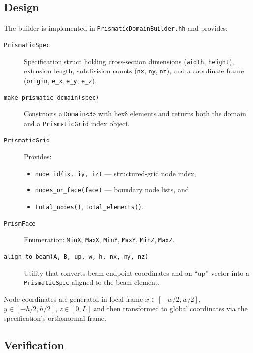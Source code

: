 \subsection{Design}

The builder is implemented in \texttt{PrismaticDomainBuilder.hh} and
provides:

\begin{description}
  \item[\texttt{PrismaticSpec}] Specification struct holding cross-section
    dimensions (\texttt{width}, \texttt{height}), extrusion length,
    subdivision counts (\texttt{nx}, \texttt{ny}, \texttt{nz}), and a
    coordinate frame (\texttt{origin}, \texttt{e\_x}, \texttt{e\_y},
    \texttt{e\_z}).

  \item[\texttt{make\_prismatic\_domain(spec)}] Constructs a
    \texttt{Domain<3>} with hex8 elements and returns both the domain
    and a \texttt{PrismaticGrid} index object.

  \item[\texttt{PrismaticGrid}] Provides:
    \begin{itemize}
      \item \texttt{node\_id(ix, iy, iz)} — structured-grid node index,
      \item \texttt{nodes\_on\_face(face)} — boundary node lists, and
      \item \texttt{total\_nodes()}, \texttt{total\_elements()}.
    \end{itemize}

  \item[\texttt{PrismFace}] Enumeration: \texttt{MinX}, \texttt{MaxX},
    \texttt{MinY}, \texttt{MaxY}, \texttt{MinZ}, \texttt{MaxZ}.

  \item[\texttt{align\_to\_beam(A, B, up, w, h, nx, ny, nz)}]
    Utility that converts beam endpoint coordinates and an ``up'' vector
    into a \texttt{PrismaticSpec} aligned to the beam element.
\end{description}

\noindent
Node coordinates are generated in local frame
$x \in [-w/2, w/2]$, $y \in [-h/2, h/2]$, $z \in [0, L]$ and then
transformed to global coordinates via the specification's orthonormal
frame.

\subsection{Verification}


